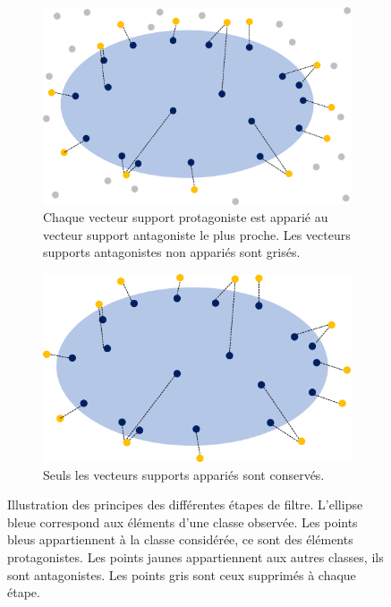 \begin{figure}[h!tpb]
    \begin{subfigure}[t]{0.45\textwidth}
      \centering\includegraphics[width=\textwidth]{S4-Explicabilite_globale/figures/filtre3.png}
      \caption{Chaque vecteur support protagoniste est apparié au vecteur support antagoniste le plus proche. Les vecteurs supports antagonistes non appariés sont grisés.} \label{fig:filtre3}
    \end{subfigure} \qquad
    \begin{subfigure}[t]{0.45\textwidth}
      \centering\includegraphics[width=\textwidth]{S4-Explicabilite_globale/figures/filtre4.png}
      \caption{Seuls les vecteurs supports appariés sont conservés.} \label{fig:filtre4}
    \end{subfigure}

\caption{Illustration des principes des différentes étapes de filtre. L'ellipse bleue correspond aux éléments d'une classe observée. Les points bleus appartiennent à la classe considérée, ce sont des éléments protagonistes. Les points jaunes appartiennent aux autres classes, ils sont antagonistes. Les points gris sont ceux supprimés à chaque étape. } \label{fig:filtre}
\end{figure}

